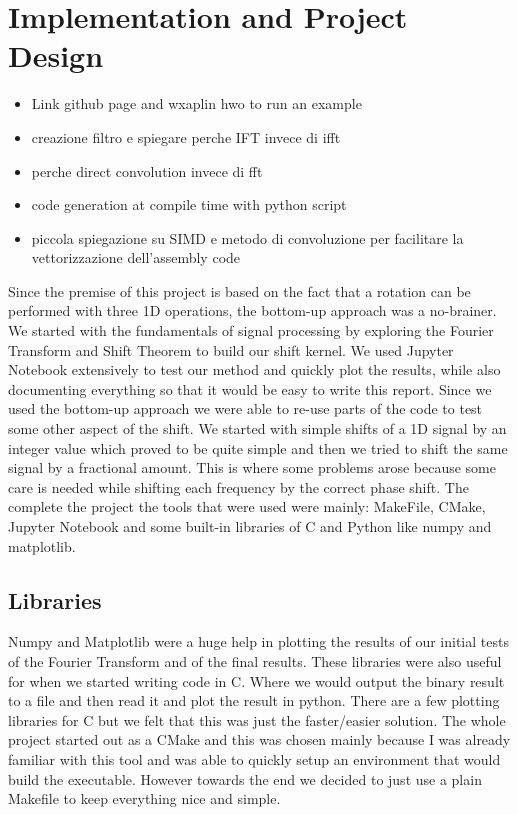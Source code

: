\documentclass[]{usiinfbachelorproject}
\begin{document}
	\newpage
	
	\section{Implementation and Project Design}
	
		\begin{itemize}
			\item Link github page and wxaplin hwo to run an example
			\item creazione filtro e spiegare perche IFT invece di ifft
			\item perche direct convolution invece di fft
			\item code generation at compile time with python script
			\item piccola spiegazione su SIMD e metodo di convoluzione per facilitare la vettorizzazione dell'assembly code
		\end{itemize}
	
	
	
		Since the premise of this project is based on the fact that a rotation can be performed with three 1D operations, the bottom-up approach was a no-brainer. We started with the fundamentals of signal processing by exploring the Fourier Transform and Shift Theorem to build our shift kernel. We used Jupyter Notebook extensively to test our method and quickly plot the results, while also documenting everything so that it would be easy to write this report. Since we used the bottom-up approach we were able to re-use parts of the code to test some other aspect of the shift. We started with simple shifts of a 1D signal by an integer value which proved to be quite simple and then we tried to shift the same signal by a fractional amount. This is where some problems arose because some care is needed while shifting each frequency by the correct phase shift.
		The complete the project the tools that were used were mainly: MakeFile, CMake, Jupyter Notebook and some built-in libraries of C and Python like numpy and matplotlib.
		
	\subsection{Libraries}
		Numpy and Matplotlib were a huge help in plotting the results of our initial tests of the Fourier Transform and of the final results. These libraries were also useful for when we started writing code in C. Where we would output the binary result to a file and then read it and plot the result in python. There are a few plotting libraries for C but we felt that this was just the faster/easier solution.
		The whole project started out as a CMake and this was chosen mainly because I was already familiar with this tool and was able to quickly setup an environment that would build the executable. However towards the end we decided to just use a plain Makefile to keep everything nice and simple.
		
\end{document}
